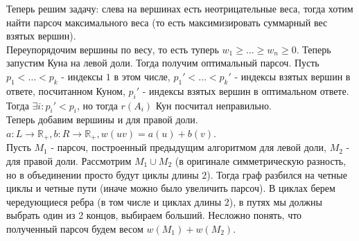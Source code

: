 \documentclass{article}
\begin{document}
Теперь решим задачу: слева на вершинах есть неотрицательные веса, тогда хотим найти парсоч максимального веса (то есть максимизировать суммарный вес взятых вершин). \\
Переупорядочим вершины по весу, то есть туперь $w_1 \ge \ldots \ge w_n \ge 0$. Теперь запустим Куна на левой доли. Тогда получим оптимальный парсоч. Пусть $p_1 < \ldots < p_k$ - индексы $1$ в этом числе, $p_1' < \ldots < p_k'$ - индексы взятых вершин в ответе, посчитанном Куном, $p_i'$ - индексы взятых вершин в оптимальном ответе. Тогда $\exists i : p_i' < p_i$, но тогда $r(A_i)$ Кун посчитал неправильно. \\

Теперь добавим вершины и для правой доли. $a : L \rightarrow \mathbb{R}_+, b : R \rightarrow \mathbb{R}_+, w(uv) = a(u) + b(v)$. \\
Пусть $M_1$ - парсоч, построенный предыдущим алгоритмом для левой доли, $M_2$ - для правой доли. Рассмотрим $M_1 \cup M_2$ (в оригинале симметрическую разность, но в объединении просто будут циклы длины $2$). Тогда граф разбился на четные циклы и четные пути (иначе можно было увеличить парсоч). В циклах берем чередующиеся ребра (в том числе и циклах длины $2$), в путях мы должны выбрать один из 2 концов, выбираем больший. Несложно понять, что полученный парсоч будем весом $w(M_1) + w(M_2)$. \\
\end{document}
